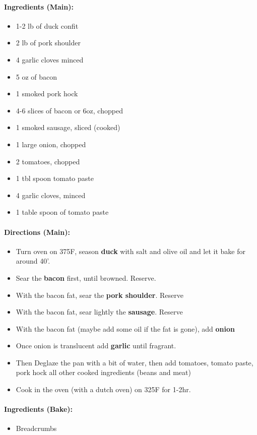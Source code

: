 \documentclass{article}
\begin{document}
\paragraph{Ingredients (Main):}
\begin{itemize}
	\item 1-2 lb of duck confit	
	\item 2 lb of pork shoulder
	\item 4 garlic cloves minced
	\item 5 oz of bacon
	\item 1 smoked pork hock
	\item 4-6 slices of bacon or 6oz, chopped
	\item 1 smoked sausage, sliced (cooked)
	\item 1 large onion, chopped
	\item 2 tomatoes, chopped
	\item 1 tbl spoon tomato paste
	\item 4 garlic cloves, minced
	\item 1 table spoon of tomato paste
\end{itemize}

\paragraph{Directions (Main):}
\begin{itemize}
	\item Turn oven on 375F, season \textbf{duck} with salt and olive oil and let it bake for around 40'.
	\item Sear the \textbf{bacon} first, until browned. Reserve.
	\item With the bacon fat, sear the \textbf{pork shoulder}. Reserve
	\item With the bacon fat, sear lightly the \textbf{sausage}. Reserve
	\item With the bacon fat (maybe add some oil if the fat is gone), add \textbf{onion}
	\item Once onion is translucent add \textbf{garlic} until fragrant.
	\item Then Deglaze the pan with a bit of water, then add tomatoes, tomato paste, pork hock all other cooked ingredients (beans and meat)
	\item Cook in the oven (with a dutch oven) on 325F for 1-2hr.
\end{itemize}

\paragraph{Ingredients (Bake):}
\begin{itemize}
	\item Breadcrumbs
\end{itemize}
\end{document}
